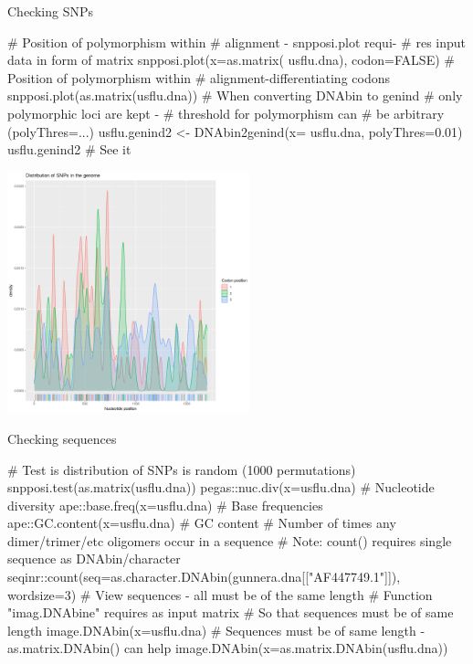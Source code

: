 \documentclass[compress, ucs, xelatex, 11pt, xcolor=svgnames, aspectratio=169,
	hyperref={
		bookmarks=true,
		unicode=true,
		colorlinks=true,
		pdftitle={Molecular data in R},
		plainpages=false,
		pdfauthor={Vojtech Zeisek},
		pdfsubject={Course about phylogeny and evolution in R},
		pdfcreator={XeLaTeX},
		pdfkeywords={R, evolution, phylogeny, molecular data},
		linkcolor=Crimson, %
		anchorcolor=Magenta, %
		citecolor=Magenta, %
		filecolor=Magenta, %
		menucolor=Magenta, %
		urlcolor=DodgerBlue, %
		pdftex},
	url={hyphens, lowtilde} %
	]{beamer}
\begin{document}
\begin{frame}[fragile]{Checking SNPs}
	\begin{multicols}{2}
		\begin{spluscode}
    # Position of polymorphism within
    # alignment - snpposi.plot requi-
    # res input data in form of matrix
    snpposi.plot(x=as.matrix(
      usflu.dna), codon=FALSE)
    # Position of polymorphism within
    # alignment-differentiating codons
    snpposi.plot(as.matrix(usflu.dna))
    # When converting DNAbin to genind
    # only polymorphic loci are kept -
    # threshold for polymorphism can
    # be arbitrary (polyThres=...)
    usflu.genind2 <- DNAbin2genind(x=
      usflu.dna, polyThres=0.01)
    usflu.genind2 # See it
		\end{spluscode}
		\begin{flushright}
			\includegraphics[height=7cm]{snpposi.png}
		\end{flushright}
	\end{multicols}
\end{frame}

\begin{frame}[fragile]{Checking sequences}
	\begin{spluscode}
    # Test is distribution of SNPs is random (1000 permutations)
    snpposi.test(as.matrix(usflu.dna))
    pegas::nuc.div(x=usflu.dna) # Nucleotide diversity
    ape::base.freq(x=usflu.dna) # Base frequencies
    ape::GC.content(x=usflu.dna) # GC content
    # Number of times any dimer/trimer/etc oligomers occur in a sequence
    # Note: count() requires single sequence as DNAbin/character
    seqinr::count(seq=as.character.DNAbin(gunnera.dna[["AF447749.1"]]),
      wordsize=3)
    # View sequences - all must be of the same length
    # Function "imag.DNAbine" requires as input matrix
    # So that sequences must be of same length
    image.DNAbin(x=usflu.dna)
    # Sequences must be of same length - as.matrix.DNAbin() can help
    image.DNAbin(x=as.matrix.DNAbin(usflu.dna))
	\end{spluscode}
\end{frame}
\end{document}
